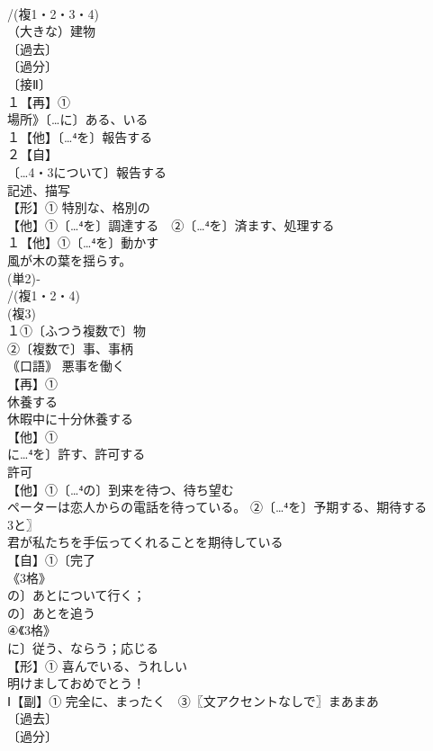 \documentclass[8pt]{extreport}
\begin{document}
\begin{CJK}{UTF8}{min}
\\	/(複1・2・3・4)
\\	（大きな）建物
\\	〔過去〕
\\	〔過分〕
\\	〔接Ⅱ〕
\\	１【再】①
\\	場所》〔…に〕ある、いる
\\	１【他】〔…⁴を〕報告する 
\\	２【自】
\\	〔…4・3について〕報告する 
\\	記述、描写 
\\	【形】① 特別な、格別の 
\\	【他】①〔…⁴を〕調達する　②〔…⁴を〕済ます、処理する
\\	１【他】①〔…⁴を〕動かす 
\\	風が木の葉を揺らす。
\\	(単2)‐
\\	/(複1・2・4)
\\	(複3)
\\	１①〔ふつう複数で〕物 
\\	②〔複数で〕事、事柄 
\\	｟口語｠ 悪事を働く
\\	【再】①
\\	休養する 
\\	休暇中に十分休養する
\\	【他】①
\\	に…⁴を〕許す、許可する 
\\	許可 
\\	【他】①〔…⁴の〕到来を待つ、待ち望む 
\\	ペーターは恋人からの電話を待っている。 ②〔…⁴を〕予期する、期待する 
\\	3と〗
\\	君が私たちを手伝ってくれることを期待している
\\	【自】①〔完了
\\	《3格》
\\	の〕あとについて行く；
\\	の〕あとを追う 
\\	④《3格》
\\	に〕従う、ならう；応じる
\\	【形】① 喜んでいる、うれしい 
\\	明けましておめでとう！
\\	Ⅰ【副】① 完全に、まったく　③〖文アクセントなしで〗まあまあ
\\	〔過去〕
\\	〔過分〕

\end{CJK}
\end{document}
